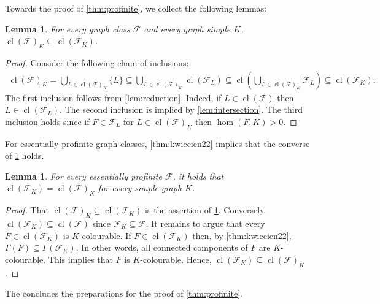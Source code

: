 \documentclass[3p,final]{elsarticle}
\DeclareMathOperator{\cl}{cl}
\newtheorem{lemma}[theorem]{Lemma}
\begin{document}
	Towards the proof of \cref{thm:profinite}, we collect the following lemmas:

	
	\begin{lemma}\label{lem:cl-col}
		For every graph class $\mathcal{F}$ and every graph simple $K$, 
		$\cl(\mathcal{F})_K \subseteq \cl(\mathcal{F}_K)$.
	\end{lemma}
	\begin{proof}
		Consider the following chain of inclusions:
		\begin{align*}
			\cl(\mathcal{F})_K 
			= \bigcup_{L \in \cl(\mathcal{F})_K} \{L\}
			\subseteq \bigcup_{L \in \cl(\mathcal{F})_K} \cl(\mathcal{F}_L)
			\subseteq \cl\left( \bigcup_{L \in \cl(\mathcal{F})_K} \mathcal{F}_L \right)
			\subseteq \cl(\mathcal{F}_K).
		\end{align*}
		The first inclusion follows from \cref{lem:reduction}. Indeed, if $L \in \cl(\mathcal{F})$ then $L \in \cl(\mathcal{F}_L)$.
		The second inclusion is implied by \cref{lem:intersection}.
		The third inclusion holds since if $F \in \mathcal{F}_L$ for $L \in \cl(\mathcal{F})_K$ then $\hom(F, K) > 0$.
	\end{proof}
	For essentially profinite graph classes, \cref{thm:kwiecien22} implies that the converse of \cref{lem:cl-col} holds.
	
	\begin{lemma} \label{lem:pf-col}
		For every essentially profinite $\mathcal{F}$, it holds that $\cl(\mathcal{F}_K) = \cl(\mathcal{F})_K$ for every simple graph $K$.
	\end{lemma}
	\begin{proof}
		That $\cl(\mathcal{F})_K \subseteq \cl(\mathcal{F}_K)$ is the assertion of \cref{lem:cl-col}.	
		Conversely, $\cl(\mathcal{F}_K) \subseteq \cl(\mathcal{F})$ since $\mathcal{F}_K \subseteq \mathcal{F}$. It remains to argue that every $F \in \cl(\mathcal{F}_K)$ is $K$-colourable.
		If $F \in \cl(\mathcal{F}_K)$  then, by \cref{thm:kwiecien22}, $\Gamma(F) \subseteq \Gamma(\mathcal{F}_K)$. In other words, all connected components of $F$ are $K$-colourable. This implies that $F$ is $K$-colourable. Hence, $\cl(\mathcal{F}_K) \subseteq \cl(\mathcal{F})_K$.
	\end{proof}
	
	The concludes the preparations for the proof of \cref{thm:profinite}.
	
\end{document}
